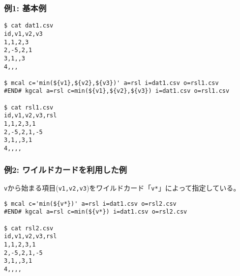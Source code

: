
\subsubsection*{例1: 基本例}


\begin{Verbatim}[baselinestretch=0.7,frame=single]
$ cat dat1.csv
id,v1,v2,v3
1,1,2,3
2,-5,2,1
3,1,,3
4,,,

$ mcal c='min(${v1},${v2},${v3})' a=rsl i=dat1.csv o=rsl1.csv
#END# kgcal a=rsl c=min(${v1},${v2},${v3}) i=dat1.csv o=rsl1.csv

$ cat rsl1.csv
id,v1,v2,v3,rsl
1,1,2,3,1
2,-5,2,1,-5
3,1,,3,1
4,,,,
\end{Verbatim}

\subsubsection*{例2: ワイルドカードを利用した例}

\verb|v|から始まる項目(\verb|v1,v2,v3|)をワイルドカード「\verb|v*|」によって指定している。

\begin{Verbatim}[baselinestretch=0.7,frame=single]
$ mcal c='min(${v*})' a=rsl i=dat1.csv o=rsl2.csv
#END# kgcal a=rsl c=min(${v*}) i=dat1.csv o=rsl2.csv

$ cat rsl2.csv
id,v1,v2,v3,rsl
1,1,2,3,1
2,-5,2,1,-5
3,1,,3,1
4,,,,
\end{Verbatim}
